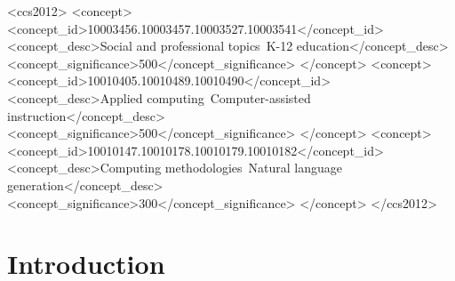 \documentclass[sigconf]{acmart}
\begin{document}
\begin{CCSXML}
<ccs2012>
   <concept>
       <concept_id>10003456.10003457.10003527.10003541</concept_id>
       <concept_desc>Social and professional topics~K-12 education</concept_desc>
       <concept_significance>500</concept_significance>
    </concept>
    <concept>
       <concept_id>10010405.10010489.10010490</concept_id>
       <concept_desc>Applied computing~Computer-assisted instruction</concept_desc>
       <concept_significance>500</concept_significance>
    </concept>
    <concept>
       <concept_id>10010147.10010178.10010179.10010182</concept_id>
       <concept_desc>Computing methodologies~Natural language generation</concept_desc>
       <concept_significance>300</concept_significance>
    </concept>
 </ccs2012>
\end{CCSXML}




\maketitle

\section{Introduction}
\end{document}
